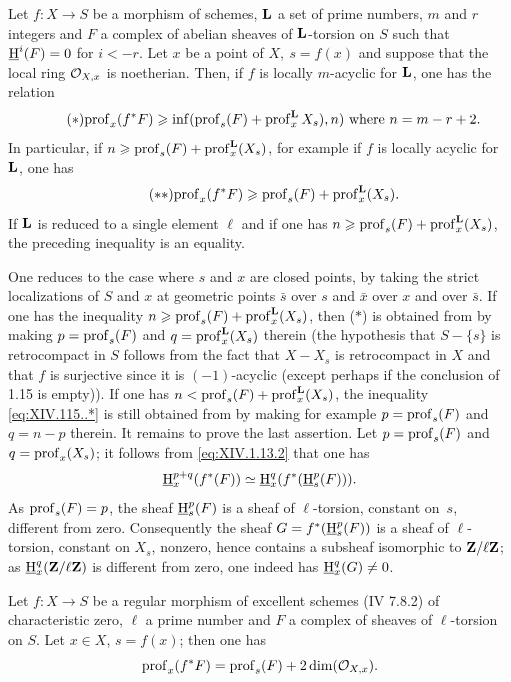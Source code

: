 \begin{corollary} \label{XIV.1.15}
Let $f:X\to S$ be a morphism of schemes, $\mathbf{L}$ a set of prime numbers, $m$ and $r$ integers and $F$ a complex of abelian sheaves of $\mathbf{L}$-torsion on $S$ such that $\operatorname{\underline{H}}^i(F)=0$ for $i<-r$. Let $x$ be a point of $X,\ s=f(x)$ and suppose that the local ring ${\mathcal O}_{X, x}$ is noetherian. Then, if $f$ is locally $m$-acyclic for $\mathbf{L}$, one has the relation
\begin{equation*} \label{eq:XIV.115..*} \tag{$*$} {\operatorname{prof}_x(f^*F)\geqslant\inf(\operatorname{prof}_s(F)+\operatorname{prof}^{\mathbf{L}}_xX_s), n)\text{ where }n=m-r+2.}
\end{equation*}
In particular, if $n\geqslant\operatorname{prof}_s(F)+\operatorname{prof}_x^{\mathbf{L}}(X_s)$, for example if $f$ is locally acyclic for $\mathbf{L}$, one has
\begin{equation*} \label{eq:XIV.15.**} \tag{$**$} {\operatorname{prof}_x(f^*F)\geqslant\operatorname{prof}_s(F)+\operatorname{prof}_x^{\mathbf{L}}(X_s).}
\end{equation*}
If $\mathbf{L}$ is reduced to a single element $\ell$ and if one has $n\geqslant \operatorname{prof}_s(F)+\operatorname{prof}_x^{\mathbf{L}}(X_s)$, the preceding inequality is an equality.
\end{corollary}

One reduces to the case where $s$ and $x$ are closed points, by taking the strict localizations of $S$ and $x$ at geometric points $\bar s$ over $s$ and $\bar x$ over $x$ and over $\bar s$. If one has the inequality $n\geqslant\operatorname{prof}_s(F)+\operatorname{prof}_x^{\mathbf{L}}(X_s)$, then ($*$) is obtained from  by making $p=\operatorname{prof}_s(F)$ and $q=\operatorname{prof}_x^{\mathbf{L}}(X_s)$ therein (the hypothesis that $S-\{s\}$ is retrocompact in $S$ follows from the fact that $X-X_s$ is retrocompact in $X$ and that $f$ is surjective since it is $(-1)$-acyclic (except perhaps if the conclusion of 1.15 is empty)). If one has $n<\operatorname{prof}_s(F)+\operatorname{prof}_x^{\mathbf{L}}(X_s)$, the inequality \eqref{eq:XIV.115..*} is still obtained from  by making for example $p=\operatorname{prof}_s(F)$ and $q=n-p$ therein. It remains to prove the last assertion. Let $p=\operatorname{prof}_s(F)$ and $q=\operatorname{prof}_x(X_s)$; it follows from \eqref{eq:XIV.1.13.2} that one has
$$
\operatorname{\underline{H}}_x^{p+q}(f^*(F))\simeq \operatorname{\underline{H}}_x^q(f^*(\operatorname{\underline{H}}^p_s(F))).
$$
As $\operatorname{prof}_s(F)=p$, the sheaf $\operatorname{\underline{H}}^p_s(F)$ is a sheaf of $\ell$-torsion, constant on~$s$, different from zero. Consequently the sheaf $G=f^*(\operatorname{\underline{H}}_s^p(F))$ is a sheaf of $\ell$-torsion, constant on $X_s$, nonzero, hence contains a subsheaf isomorphic to $\mathbf{Z}/\ell\mathbf{Z}$; as $\operatorname{\underline{H}}_x^q(\mathbf{Z}/\ell\mathbf{Z})$ is different from zero, one indeed has $\operatorname{\underline{H}}_x^q(G)\neq 0$.

\begin{corollary} \label{XIV.1.16}
Let $f:X\to S$ be a regular morphism of excellent schemes (\textup{\EGA IV 7.8.2}) of characteristic zero, $\ell$ a prime number and $F$ a complex of sheaves of $\ell$-torsion on $S$. Let $x\in X$, $s=f(x)$; then one has
$$
\operatorname{prof}_x(f^*F)=\operatorname{prof}_s(F)+2\dim({\mathcal O}_{X, x}).
$$
\end{corollary}

